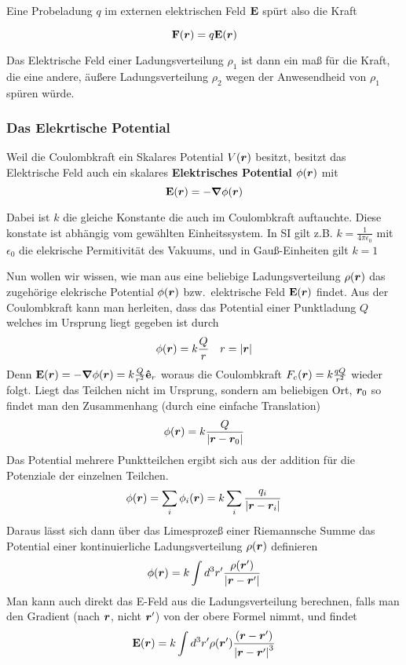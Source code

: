 Eine Probeladung $q$ im externen elektrischen Feld $\vb E$ spürt also die Kraft

\begin{equation}
  \vb F(\vb*r) = q \vb E(\vb*r)
\end{equation}

Das Elektrische Feld einer Ladungsverteilung $\rho_1$ ist dann ein 
maß für die Kraft, die eine andere, äußere Ladungsverteilung $\rho_2$ 
wegen der Anwesendheid von $\rho_1$ spüren würde. 

\subsubsection{Das Elekrtische Potential}%
\label{ssub:E-pot}
Weil die Coulombkraft ein
Skalares Potential $V(\vb*r)$ besitzt, 
besitzt das Elektrische Feld auch ein skalares \textbf{Elektrisches Potential}
$\phi(\vb*r)$ mit
\begin{equation}
  \vb E(\vb*r)=-\grad \phi(\vb*r)
\end{equation}

Dabei ist $k$ die gleiche Konstante die auch im Coulombkraft auftauchte. Diese
konstate ist abhängig vom gewählten Einheitssystem. In SI gilt z.B. 
$k=\frac{1}{4\pi\epsilon_0}$ mit $\epsilon_0$ die elekrische Permitivität des
Vakuums, und in Gauß-Einheiten gilt $k=1$

Nun wollen wir wissen, wie man aus eine beliebige 
Ladungsverteilung $\rho(\vb*r)$ das zugehörige
elekrische Potential $\phi(\vb*r)$ bzw.\ elektrische Feld $\vb E(\vb*r)$ 
findet. Aus der Coulombkraft kann man herleiten, dass das Potential
einer Punktladung $Q$ welches im Ursprung liegt gegeben ist durch
\begin{equation*}
  \phi(\vb*r) = k  \frac{Q}{r} \quad r=\abs{\vb*r}
\end{equation*}
Denn $\vb E(\vb*r)=-\grad\phi(\vb*r)=k \frac{Q}{r^2}\vu e_r $ 
woraus die Coulombkraft $F_c(\vb*r)=k \frac{qQ}{r^2}$ wieder folgt.
Liegt das Teilchen nicht im Ursprung, sondern am beliebigen Ort, $\vb*r_0$
so findet man den Zusammenhang (durch eine einfache Translation)
\begin{equation*}
  \phi(\vb*r) = k \frac{Q}{\abs{\vb*r - \vb*r_0}}
\end{equation*}
Das Potential mehrere Punktteilchen ergibt sich aus der addition für die 
Potenziale der einzelnen Teilchen.
\begin{equation*}
  \phi(\vb*r) = \sum_i \phi_i(\vb*r) = k\sum_i \frac{q_i}{\abs{\vb*r-\vb*r_i}}
\end{equation*}
Daraus lässt sich dann über das Limesprozeß einer Riemannsche Summe das 
Potential einer kontinuierliche Ladungsverteilung $\rho(\vb*r)$ definieren
\begin{equation}
  \phi(\vb*r) = k \int d^3 r' \frac{\rho(\vb*r')}{\abs{\vb*r-\vb*r'}} 
\end{equation}
Man kann auch direkt das E-Feld aus die Ladungsverteilung berechnen, falls 
man den Gradient (nach $\vb*r$, nicht $\vb*r'$) von der obere Formel nimmt, 
und findet
\begin{equation}
  \vb E(\vb*r) = k \int d^3r' 
  \rho(\vb*r')\frac{(\vb*r-\vb*r')}{\abs{\vb*r-\vb*r'}^3} 
\end{equation}

